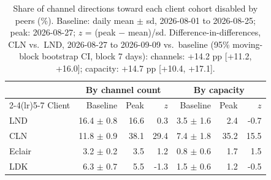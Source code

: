 \begin{table}[t]
\centering
\caption{Share of channel directions toward each client cohort disabled by peers (\%). Baseline: daily mean $\pm$ sd, 2026-08-01 to 2026-08-25; peak: 2026-08-27; $z$ = (peak $-$ mean)/sd. Difference-in-differences, CLN vs.\ LND, 2026-08-27 to 2026-09-09 vs.\ baseline (95\% moving-block bootstrap CI, block 7 days): channels: +14.2 pp [+11.2, +16.0]; capacity: +14.7 pp [+10.4, +17.1].}
\label{tab:outage-effect}
\small
\begin{tabular}{lrrrrrr}
\toprule
 & \multicolumn{3}{c}{By channel count} & \multicolumn{3}{c}{By capacity} \\
\cmidrule(lr){2-4}\cmidrule(lr){5-7}
Client & Baseline & Peak & $z$ & Baseline & Peak & $z$ \\
\midrule
LND & 16.4 $\pm$ 0.8 & 16.6 & 0.3 & 3.5 $\pm$ 1.6 & 2.4 & -0.7 \\
CLN & 11.8 $\pm$ 0.9 & 38.1 & 29.4 & 7.4 $\pm$ 1.8 & 35.2 & 15.5 \\
Eclair & 3.2 $\pm$ 0.2 & 3.5 & 1.2 & 0.8 $\pm$ 0.6 & 1.7 & 1.5 \\
LDK & 6.3 $\pm$ 0.7 & 5.5 & -1.3 & 1.5 $\pm$ 0.6 & 1.2 & -0.5 \\
\bottomrule
\end{tabular}
\end{table}
